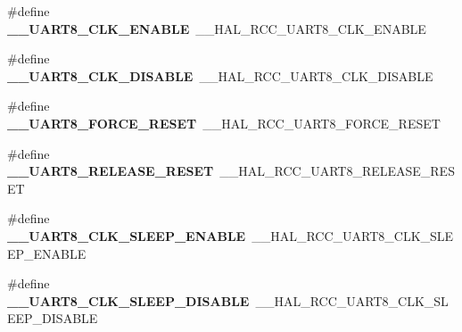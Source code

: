 \begin{DoxyCompactItemize}
\item 
\#define {\bfseries \+\_\+\+\_\+\+U\+A\+R\+T8\+\_\+\+C\+L\+K\+\_\+\+E\+N\+A\+B\+LE}~\+\_\+\+\_\+\+H\+A\+L\+\_\+\+R\+C\+C\+\_\+\+U\+A\+R\+T8\+\_\+\+C\+L\+K\+\_\+\+E\+N\+A\+B\+LE\hypertarget{group___h_a_l___r_c_c___aliased_gad5875e7ed7c3a6d37da63cdf41998f52}{}\label{group___h_a_l___r_c_c___aliased_gad5875e7ed7c3a6d37da63cdf41998f52}

\item 
\#define {\bfseries \+\_\+\+\_\+\+U\+A\+R\+T8\+\_\+\+C\+L\+K\+\_\+\+D\+I\+S\+A\+B\+LE}~\+\_\+\+\_\+\+H\+A\+L\+\_\+\+R\+C\+C\+\_\+\+U\+A\+R\+T8\+\_\+\+C\+L\+K\+\_\+\+D\+I\+S\+A\+B\+LE\hypertarget{group___h_a_l___r_c_c___aliased_ga623f01b12af9603571fa4e40f186860c}{}\label{group___h_a_l___r_c_c___aliased_ga623f01b12af9603571fa4e40f186860c}

\item 
\#define {\bfseries \+\_\+\+\_\+\+U\+A\+R\+T8\+\_\+\+F\+O\+R\+C\+E\+\_\+\+R\+E\+S\+ET}~\+\_\+\+\_\+\+H\+A\+L\+\_\+\+R\+C\+C\+\_\+\+U\+A\+R\+T8\+\_\+\+F\+O\+R\+C\+E\+\_\+\+R\+E\+S\+ET\hypertarget{group___h_a_l___r_c_c___aliased_ga138e06749e64d444de65bbef30dd3fe1}{}\label{group___h_a_l___r_c_c___aliased_ga138e06749e64d444de65bbef30dd3fe1}

\item 
\#define {\bfseries \+\_\+\+\_\+\+U\+A\+R\+T8\+\_\+\+R\+E\+L\+E\+A\+S\+E\+\_\+\+R\+E\+S\+ET}~\+\_\+\+\_\+\+H\+A\+L\+\_\+\+R\+C\+C\+\_\+\+U\+A\+R\+T8\+\_\+\+R\+E\+L\+E\+A\+S\+E\+\_\+\+R\+E\+S\+ET\hypertarget{group___h_a_l___r_c_c___aliased_ga88357c03e387b9df7ef294f5d46bb936}{}\label{group___h_a_l___r_c_c___aliased_ga88357c03e387b9df7ef294f5d46bb936}

\item 
\#define {\bfseries \+\_\+\+\_\+\+U\+A\+R\+T8\+\_\+\+C\+L\+K\+\_\+\+S\+L\+E\+E\+P\+\_\+\+E\+N\+A\+B\+LE}~\+\_\+\+\_\+\+H\+A\+L\+\_\+\+R\+C\+C\+\_\+\+U\+A\+R\+T8\+\_\+\+C\+L\+K\+\_\+\+S\+L\+E\+E\+P\+\_\+\+E\+N\+A\+B\+LE\hypertarget{group___h_a_l___r_c_c___aliased_ga75ecbea6d7f140ed4600d5759aca2757}{}\label{group___h_a_l___r_c_c___aliased_ga75ecbea6d7f140ed4600d5759aca2757}

\item 
\#define {\bfseries \+\_\+\+\_\+\+U\+A\+R\+T8\+\_\+\+C\+L\+K\+\_\+\+S\+L\+E\+E\+P\+\_\+\+D\+I\+S\+A\+B\+LE}~\+\_\+\+\_\+\+H\+A\+L\+\_\+\+R\+C\+C\+\_\+\+U\+A\+R\+T8\+\_\+\+C\+L\+K\+\_\+\+S\+L\+E\+E\+P\+\_\+\+D\+I\+S\+A\+B\+LE\hypertarget{group___h_a_l___r_c_c___aliased_ga030bdf79bf7818a7a086504731c958a0}{}\label{group___h_a_l___r_c_c___aliased_ga030bdf79bf7818a7a086504731c958a0}


\end{DoxyCompactItemize}
